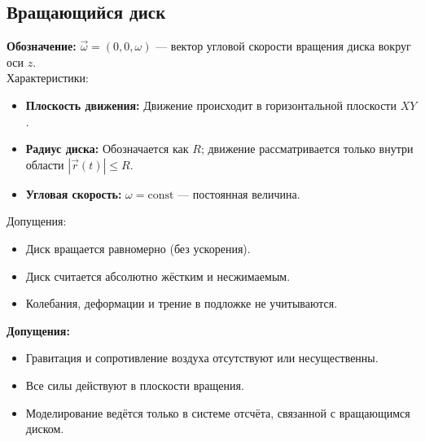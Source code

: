 \documentclass[a4paper,12pt]{article}
\begin{document}
\subsection{Вращающийся диск}

\textbf{Обозначение:} $\vec{\omega} = (0, 0, \omega)$ — вектор угловой скорости вращения диска вокруг оси $z$. \\
Характеристики:
\begin{itemize}
    \item \textbf{Плоскость движения:} Движение происходит в горизонтальной плоскости $XY$.
    \item \textbf{Радиус диска:} Обозначается как $R$; движение рассматривается только внутри области $|\vec{r}(t)| \leq R$.
    \item \textbf{Угловая скорость:} $\omega = \text{const}$ — постоянная величина.
\end{itemize}
Допущения:
\begin{itemize}
    \item Диск вращается равномерно (без ускорения).
    \item Диск считается абсолютно жёстким и несжимаемым.
    \item Колебания, деформации и трение в подложке не учитываются.
\end{itemize}




\textbf{Допущения:}
\begin{itemize}
    \item Гравитация и сопротивление воздуха отсутствуют или несущественны.
    \item Все силы действуют в плоскости вращения.
    \item Моделирование ведётся только в системе отсчёта, связанной с вращающимся диском.
\end{itemize}
\end{document}
